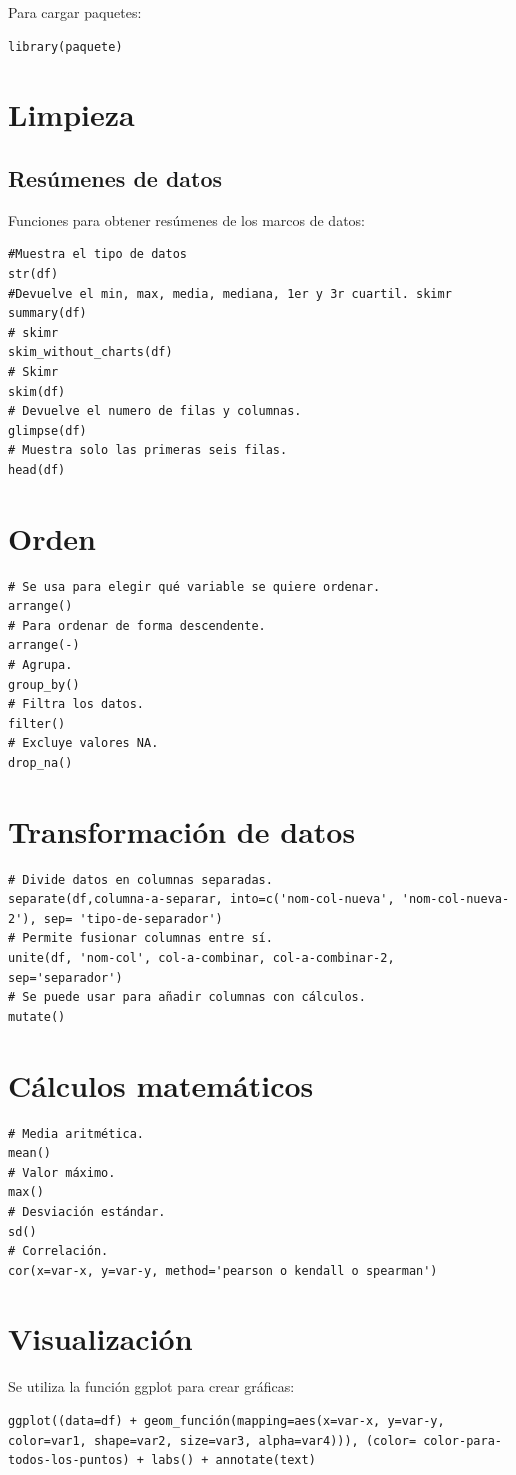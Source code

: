 \documentclass[a4paper, 12pt]{book}
\begin{document}
Para cargar paquetes:
\begin{verbatim}
library(paquete)
\end{verbatim}
\section{Limpieza}
\subsection{Resúmenes de datos}
Funciones para obtener resúmenes de los marcos de datos:
\begin{verbatim}
#Muestra el tipo de datos
str(df)
#Devuelve el min, max, media, mediana, 1er y 3r cuartil. skimr
summary(df)
# skimr
skim_without_charts(df)
# Skimr
skim(df)
# Devuelve el numero de filas y columnas.
glimpse(df)
# Muestra solo las primeras seis filas.
head(df)
\end{verbatim}
\section{Orden}
\begin{verbatim}
# Se usa para elegir qué variable se quiere ordenar.
arrange()
# Para ordenar de forma descendente.
arrange(-)
# Agrupa.
group_by()
# Filtra los datos.
filter()
# Excluye valores NA.
drop_na()
\end{verbatim}
\section{Transformación de datos}
\begin{verbatim}
# Divide datos en columnas separadas.
separate(df,columna-a-separar, into=c('nom-col-nueva', 'nom-col-nueva-2'), sep= 'tipo-de-separador')
# Permite fusionar columnas entre sí.
unite(df, 'nom-col', col-a-combinar, col-a-combinar-2, sep='separador')
# Se puede usar para añadir columnas con cálculos.
mutate()
\end{verbatim}
\section{Cálculos matemáticos}
\begin{verbatim}
# Media aritmética.
mean()
# Valor máximo.
max()
# Desviación estándar.
sd()
# Correlación.
cor(x=var-x, y=var-y, method='pearson o kendall o spearman')
\end{verbatim}
\section{Visualización}
Se utiliza la función ggplot para crear gráficas:
\begin{verbatim}
ggplot((data=df) + geom_función(mapping=aes(x=var-x, y=var-y, color=var1, shape=var2, size=var3, alpha=var4))), (color= color-para-todos-los-puntos) + labs() + annotate(text)
\end{verbatim}
\end{document}

